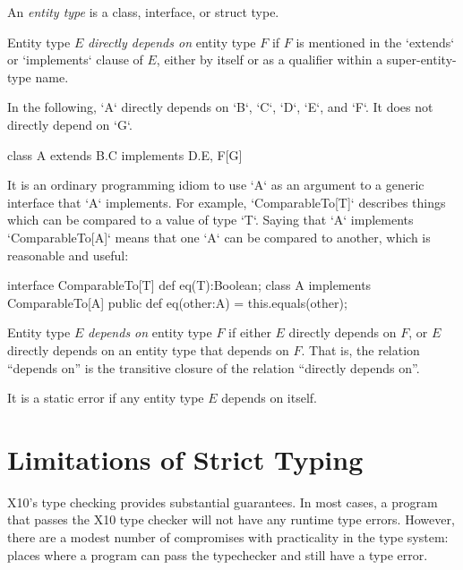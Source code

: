 {An {\em entity type} is a class, interface, or struct type.   

Entity type $E$ {\em directly depends on} entity type $F$ if $F$ is mentioned
in the \xcd`extends` or \xcd`implements` clause of $E$, either by itself or as
a qualifier within a super-entity-type name.  
\begin{eg}
In the following, \xcd`A` directly depends on \xcd`B`, \xcd`C`, \xcd`D`, 
\xcd`E`, and \xcd`F`.    It does not directly depend on \xcd`G`.
\begin{xten}
class A extends B.C implements D.E, F[G] {}
\end{xten}
%
It is an ordinary programming idiom to use \xcd`A` as an argument to a generic
interface that \xcd`A` implements.  For example, \xcd`ComparableTo[T]`
describes things which can be compared to a value of type \xcd`T`. Saying that
\xcd`A` implements \xcd`ComparableTo[A]` means that one \xcd`A` can be
compared to another, which is reasonable and useful: 
\begin{xten}
interface ComparableTo[T] {
  def eq(T):Boolean;
}
class A implements ComparableTo[A] {
  public def eq(other:A) = this.equals(other);
}
\end{xten}
%

\end{eg}

Entity type $E$ {\em depends on} entity type $F$ if
either $E$ directly depends on $F$, or $E$ directly depends on an entity type
that depends on $F$.   That is, the relation ``depends on'' is the transitive
closure of the relation ``directly depends on''.  

It is a static error if any entity type $E$ depends on itself.

\section{Limitations of Strict Typing}

X10's type checking provides substantial guarantees.  In most cases, a program
that passes the X10 type checker will not have any runtime type errors.
However, there are a modest number of compromises with practicality in the
type system: places where a program can pass the typechecker and still have a
type error.

}
